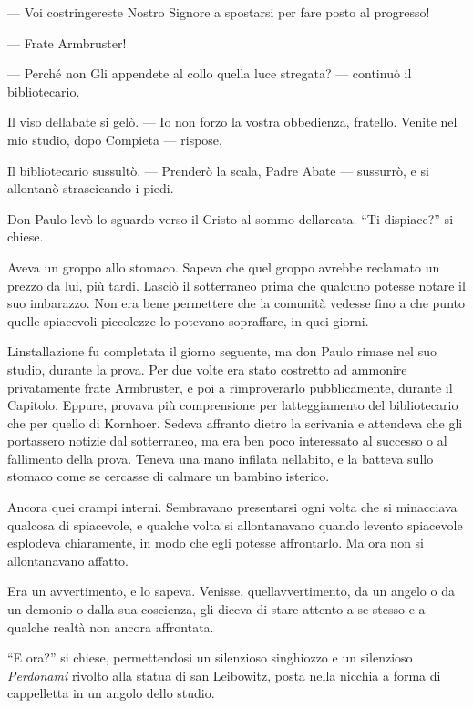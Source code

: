 --- Voi costringereste Nostro Signore a spostarsi per fare posto al
progresso!

--- Frate Armbruster!

--- Perché non Gli appendete al collo quella luce stregata? --- continuò
il bibliotecario.

Il viso dell\textquotesingle abate si gelò. --- Io non forzo la vostra
obbedienza, fratello. Venite nel mio studio, dopo Compieta --- rispose.

Il bibliotecario sussultò. --- Prenderò la scala, Padre Abate ---
sussurrò, e si allontanò strascicando i piedi.

Don Paulo levò lo sguardo verso il Cristo al sommo
dell\textquotesingle arcata. ``Ti dispiace?'' si chiese.

Aveva un groppo allo stomaco. Sapeva che quel groppo avrebbe reclamato
un prezzo da lui, più tardi. Lasciò il sotterraneo prima che qualcuno
potesse notare il suo imbarazzo. Non era bene permettere che la comunità
vedesse fino a che punto quelle spiacevoli piccolezze lo potevano
sopraffare, in quei giorni.

L\textquotesingle installazione fu completata il giorno seguente, ma don
Paulo rimase nel suo studio, durante la prova. Per due volte era stato
costretto ad ammonire privatamente frate Armbruster, e poi a
rimproverarlo pubblicamente, durante il Capitolo. Eppure, provava più
comprensione per l\textquotesingle atteggiamento del bibliotecario che
per quello di Kornhoer. Sedeva affranto dietro la scrivania e attendeva
che gli portassero notizie dal sotterraneo, ma era ben poco interessato
al successo o al fallimento della prova. Teneva una mano infilata
nell\textquotesingle abito, e la batteva sullo stomaco come se cercasse
di calmare un bambino isterico.

Ancora quei crampi interni. Sembravano presentarsi ogni volta che si
minacciava qualcosa di spiacevole, e qualche volta si allontanavano
quando l\textquotesingle evento spiacevole esplodeva chiaramente, in
modo che egli potesse affrontarlo. Ma ora non si allontanavano affatto.

Era un avvertimento, e lo sapeva. Venisse,
quell\textquotesingle avvertimento, da un angelo o da un demonio o dalla
sua coscienza, gli diceva di stare attento a se stesso e a qualche
realtà non ancora affrontata.

``E ora?'' si chiese, permettendosi un silenzioso singhiozzo e un
silenzioso \emph{Perdonami} rivolto alla statua di san Leibowitz, posta
nella nicchia a forma di cappelletta in un angolo dello studio.

